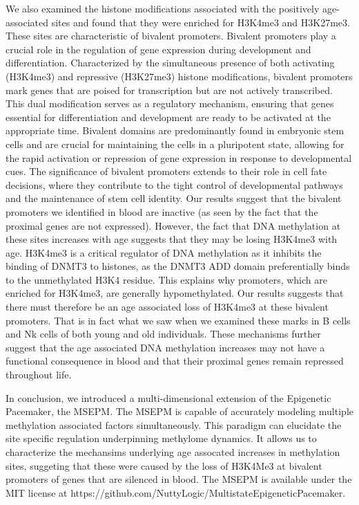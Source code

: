 \documentclass{article}
\begin{document}
{\begin{linenumbers}
We also examined the histone modifications associated with the positively age-associated sites and found that they were 
enriched for H3K4me3 and H3K27me3.  These sites are characteristic of bivalent promoters.  Bivalent promoters play a 
crucial role in the regulation of gene expression during development and differentiation. Characterized by the simultaneous 
presence of both activating (H3K4me3) and repressive (H3K27me3) histone modifications, bivalent promoters mark genes that 
are poised for transcription but are not actively transcribed. This dual modification serves as a regulatory mechanism, 
ensuring that genes essential for differentiation and development are ready to be activated at the appropriate time. 
Bivalent domains are predominantly found in embryonic stem cells and are crucial for maintaining the cells in a 
pluripotent state, allowing for the rapid activation or repression of gene expression in response to developmental 
cues. The significance of bivalent promoters extends to their role in cell fate decisions, where they contribute 
to the tight control of developmental pathways and the maintenance of stem cell identity\cite{Bernstein2006-wt,Voigt2013-fe}. 
Our results suggest that the bivalent promoters we identified in blood are inactive (as seen by the fact that the proximal genes are not expressed). 
However, the fact that DNA methylation at these sites increases with age suggests that they may be losing H3K4me3 with age. H3K4me3 is a critical 
regulator of DNA methylation as it inhibits the binding of DNMT3 to histones, as the DNMT3 ADD domain preferentially binds to the unmethylated 
H3K4 residue\cite{Ooi2007-dw}.  This explains why promoters, which are enriched for H3K4me3, are generally hypomethylated.  Our results 
suggests that there must therefore be an age associated loss of H3K4me3 at these bivalent promoters. That is in fact what we saw when we
 examined these marks in B cells and Nk cells of both young and old individuals.  These mechanisms further suggest that the age 
 associated DNA methylation increases may not have a functional consequence in blood and that their proximal genes remain repressed throughout life.

In conclusion, we introduced a multi-dimensional extension of the Epigenetic Pacemaker, the MSEPM. The MSEPM is capable of 
accurately modeling multiple methylation associated factors simultaneously. This paradigm can elucidate the site specific 
regulation underpinning methylome dynamics. It allows us to characterize the mechansims underlying age assocated increases 
in methylation sites, suggeting that these were caused by the loss of H3K4Me3 at bivalent promoters of genes that are silenced 
in blood.  The MSEPM is available under the MIT license at https://github.com/NuttyLogic/MultistateEpigeneticPacemaker. 


\end{linenumbers}}
\end{document}
